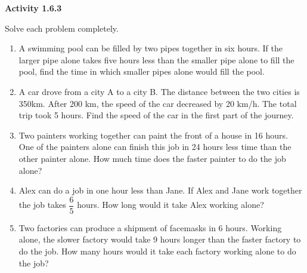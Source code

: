 \vspace{1ex}
\noindent\textbf{Activity 1.6.3}

\vspace{0.75ex}

Solve each problem completely.
\begin{enumerate}[label = \color{blue}\arabic*. ]
\item A swimming pool can be filled by two pipes together in six hours. If the larger pipe alone takes five hours less than the smaller pipe alone to fill the pool, find the time in which smaller pipes alone would fill the pool.
\item A car drove from a city A to a city B. The distance between the two cities is 350km. After 200 km, the speed of the car decreased by 20 km/h. The total trip took 5 hours. Find the speed of the car in the first part of the journey.
\item Two painters working together can paint the front of a house in 16 hours. One of the painters alone can finish this job in 24 hours less time than the other painter alone. How much time does the faster painter to do the job alone?
\item Alex can do a job in one hour less than Jane. If Alex and Jane work together the job takes $\dfrac{6}{5}$ hours. How long would it take Alex working alone?
\item Two factories can produce a shipment of facemasks in 6 hours. Working alone, the slower factory would take 9 hours longer than the faster factory to do the job. How many hours would it take each factory working alone to do the job?
\end{enumerate}
